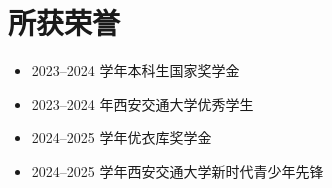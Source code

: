 \documentclass[11pt]{ctexart}
\begin{document}
\section{所获荣誉}

\begin{itemize}[leftmargin=*,itemsep=2pt,topsep=2pt,label={}]
  \item 2023--2024 学年本科生国家奖学金
  \item 2023--2024 年西安交通大学优秀学生
  \item 2024--2025 学年优衣库奖学金
  \item 2024--2025 学年西安交通大学新时代青少年先锋
\end{itemize}



\end{document}
